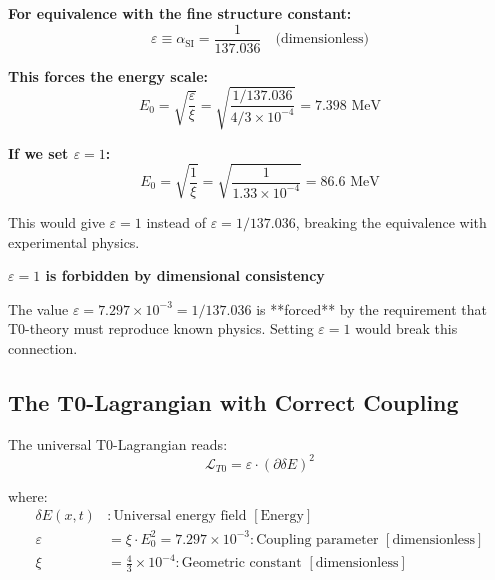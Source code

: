 \documentclass[12pt,a4paper]{article}
\numberwithin{equation}{section}
\newcommand{\xipar}{\xi}
\newcommand{\epsilonT}{\varepsilon}
\newcommand{\alphaSI}{\alpha_{\text{SI}}}
\newcommand{\calL}{\mathcal{L}}
\newcommand{\Eo}{E_0}
\begin{document}
	\textbf{For equivalence with the fine structure constant:}
	\begin{equation}
		\epsilonT \equiv \alphaSI = \frac{1}{137.036} \quad \text{(dimensionless)}
		\label{eq:equivalence_simple}
	\end{equation}
	
	\textbf{This forces the energy scale:}
	\begin{equation}
		\Eo = \sqrt{\frac{ \epsilonT}{\xipar}} = \sqrt{\frac{1/137.036}{4/3 \times 10^{-4}}} = 7.398 \text{ MeV}
		\label{eq:e0_forced}
	\end{equation}
	
	\textbf{If we set $\epsilonT = 1$:}
	\begin{equation}
		\Eo = \sqrt{\frac{1}{\xipar}} = \sqrt{\frac{1}{1.33 \times 10^{-4}}} = 86.6 \text{ MeV}
		\label{eq:e0_wrong}
	\end{equation}
	
	This would give $\epsilonT = 1$ instead of $\epsilonT = 1/137.036$, breaking the equivalence with experimental physics.
	
	\begin{tcolorbox}[title={\textbf{CONCLUSION}},colframe=blue,colback=blue!5]
		\textbf{$\epsilonT = 1$ is forbidden by dimensional consistency}
		
		The value $\epsilonT = 7.297 \times 10^{-3} = 1/137.036$ is **forced** by the requirement that T0-theory must reproduce known physics. Setting $\epsilonT = 1$ would break this connection.
	\end{tcolorbox}
	
	
	
	
	
	\subsection{The T0-Lagrangian with Correct Coupling}
	
	The universal T0-Lagrangian reads:
	\begin{equation}
		\calL_{T0} = \epsilonT \cdot (\partial \delta E)^2
		\label{eq:t0_lagrangian}
	\end{equation}
	
	where:
	\begin{align}
		\delta E(x,t) &: \text{Universal energy field } [\text{Energy}]\\
		\epsilonT &= \xipar \cdot \Eo^2 = 7.297 \times 10^{-3} : \text{Coupling parameter } [\text{dimensionless}]\\
		\xipar &= \frac{4}{3} \times 10^{-4} : \text{Geometric constant } [\text{dimensionless}]
	\end{align}
	
\end{document}
